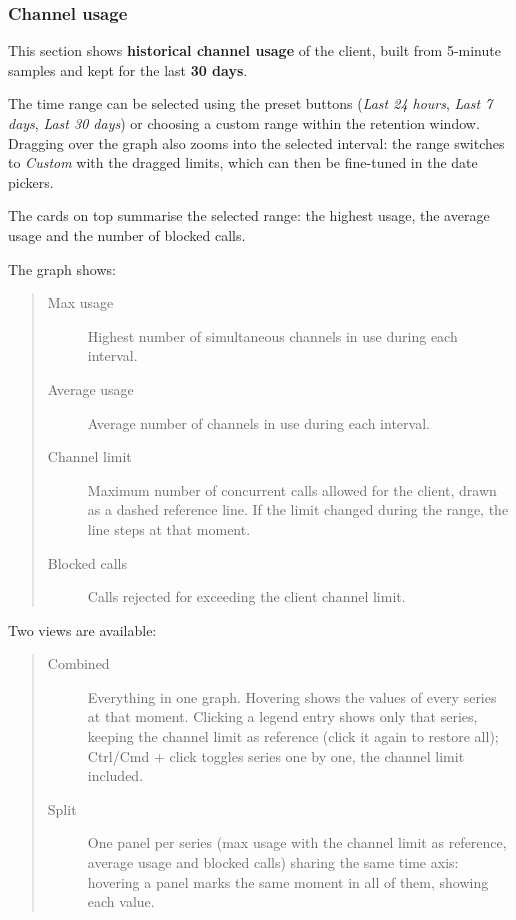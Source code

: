 \documentclass[letterpaper,10pt,english]{sphinxmanual}
\begin{document}
\subsubsection{Channel usage}
\label{administration_portal/client/wholesale/calls/channel_usage:channel-usage}\label{administration_portal/client/wholesale/calls/channel_usage::doc}
This section shows \textbf{historical channel usage} of the client, built from 5-minute samples and kept for the last
\textbf{30 days}.

The time range can be selected using the preset buttons (\emph{Last 24 hours}, \emph{Last 7 days}, \emph{Last 30 days}) or choosing
a custom range within the retention window. Dragging over the graph also zooms into the selected interval: the range
switches to \emph{Custom} with the dragged limits, which can then be fine-tuned in the date pickers.

The cards on top summarise the selected range: the highest usage, the average usage and the number of blocked calls.

The graph shows:
\begin{quote}
\begin{description}
\item[{Max usage}] \leavevmode
Highest number of simultaneous channels in use during each interval.

\item[{Average usage}] \leavevmode
Average number of channels in use during each interval.

\item[{Channel limit}] \leavevmode
Maximum number of concurrent calls allowed for the client, drawn as a dashed reference line. If the limit
changed during the range, the line steps at that moment.

\item[{Blocked calls}] \leavevmode
Calls rejected for exceeding the client channel limit.

\end{description}
\end{quote}

Two views are available:
\begin{quote}
\begin{description}
\item[{Combined}] \leavevmode
Everything in one graph. Hovering shows the values of every series at that moment. Clicking a legend entry
shows only that series, keeping the channel limit as reference (click it again to restore all); Ctrl/Cmd +
click toggles series one by one, the channel limit included.

\item[{Split}] \leavevmode
One panel per series (max usage with the channel limit as reference, average usage and blocked calls) sharing
the same time axis: hovering a panel marks the same moment in all of them, showing each value.

\end{description}
\end{quote}
\end{document}
